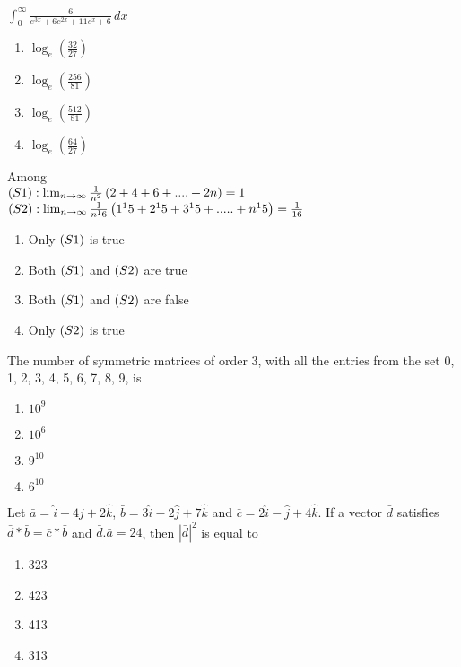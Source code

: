 \iffalse
\title{2023}
\author{AI24BTECH11013}
\section{mcq-single}
\fi
\item $\int_0^{\infty} \frac{6}{e^{3x} + 6e^{2x} + 11e^{x} + 6} \, dx$
\hfill{}
\begin{enumerate}
    \item $\log_e(\frac{32}{27})$
    \item $\log_e(\frac{256}{81})$
    \item $\log_e(\frac{512}{81})$
    \item $\log_e(\frac{64}{27})$
\end{enumerate}
\item Among\\
$ \left(S1\right) : \lim_{n \to \infty} \frac{1}{n^2} \left(2+4+6+....+2n\right) = 1$\\
$\left(S2\right) : \lim_{n \to \infty} \frac{1}{n^16} \left(1^15 +2^15 +3^15 +.....+ n^15\right) = \frac{1}{16}$
\hfill{}
\begin{enumerate}
    \item Only $\left(S1\right)$ is true
    \item Both $\left(S1\right)$ and $\left(S2\right)$ are true 
    \item Both $\left(S1\right)$ and $\left(S2\right)$ are false
    \item Only $\left(S2\right)$ is true
\end{enumerate}
\item The number of symmetric matrices of order 3, with all the entries from the set {0, 1, 2, 3, 4, 5, 6, 7, 8, 9}, is
\begin{enumerate}
    \item $10^9$
    \item $10^6$
    \item $9^{10}$
    \item $6^{10}$
\end{enumerate}
\item Let $\bar{a} = \hat{i} + 4\hat{j} +2\hat{k}$, $\bar{b} = 3\hat{i}-2\hat{j}+7\hat{k}$ and $\bar{c} = 2\hat{i}-\hat{j}+4\hat{k}$. If a vector $\bar{d}$ satisfies $\bar{d}*\bar{b} = \bar{c}*\bar{b}$ and $\bar{d}.\bar{a}=24$, then $|\bar{d}|^2$ is equal to 
\hfill{}
\begin{enumerate}
    \item 323
    \item 423
    \item 413
    \item 313
\end{enumerate}
